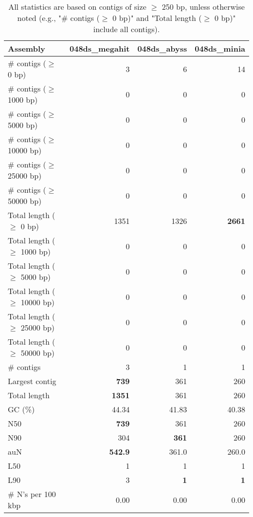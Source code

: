 \documentclass[12pt,a4paper]{article}
\begin{document}
\begin{table}[ht]
\begin{center}
\caption{All statistics are based on contigs of size $\geq$ 250 bp, unless otherwise noted (e.g., "\# contigs ($\geq$ 0 bp)" and "Total length ($\geq$ 0 bp)" include all contigs).}
\begin{tabular}{|l*{3}{|r}|}
\hline
Assembly & 048ds\_megahit & 048ds\_abyss & 048ds\_minia \\ \hline
\# contigs ($\geq$ 0 bp) & 3 & 6 & 14 \\ \hline
\# contigs ($\geq$ 1000 bp) & 0 & 0 & 0 \\ \hline
\# contigs ($\geq$ 5000 bp) & 0 & 0 & 0 \\ \hline
\# contigs ($\geq$ 10000 bp) & 0 & 0 & 0 \\ \hline
\# contigs ($\geq$ 25000 bp) & 0 & 0 & 0 \\ \hline
\# contigs ($\geq$ 50000 bp) & 0 & 0 & 0 \\ \hline
Total length ($\geq$ 0 bp) & 1351 & 1326 & {\bf 2661} \\ \hline
Total length ($\geq$ 1000 bp) & 0 & 0 & 0 \\ \hline
Total length ($\geq$ 5000 bp) & 0 & 0 & 0 \\ \hline
Total length ($\geq$ 10000 bp) & 0 & 0 & 0 \\ \hline
Total length ($\geq$ 25000 bp) & 0 & 0 & 0 \\ \hline
Total length ($\geq$ 50000 bp) & 0 & 0 & 0 \\ \hline
\# contigs & 3 & 1 & 1 \\ \hline
Largest contig & {\bf 739} & 361 & 260 \\ \hline
Total length & {\bf 1351} & 361 & 260 \\ \hline
GC (\%) & 44.34 & 41.83 & 40.38 \\ \hline
N50 & {\bf 739} & 361 & 260 \\ \hline
N90 & 304 & {\bf 361} & 260 \\ \hline
auN & {\bf 542.9} & 361.0 & 260.0 \\ \hline
L50 & 1 & 1 & 1 \\ \hline
L90 & 3 & {\bf 1} & {\bf 1} \\ \hline
\# N's per 100 kbp & 0.00 & 0.00 & 0.00 \\ \hline
\end{tabular}
\end{center}
\end{table}
\end{document}
